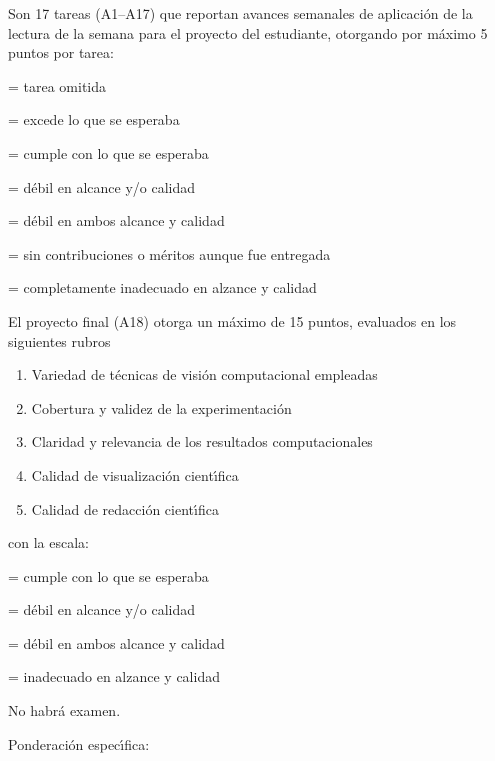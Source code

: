 \documentclass[10 pt]{article}
\begin{document}
  Son 17 tareas (A1--A17) que reportan avances semanales de aplicaci\'{o}n
  de la lectura de la semana para el proyecto del estudiante,
  otorgando por m\'{a}ximo 5 puntos por tarea:
  \begin{description}[itemsep=0em]
  \item[NP]{= tarea omitida}
  \item[5]{= excede lo que se esperaba}
  \item[4]{= cumple con lo que se esperaba}
  \item[3]{= d\'{e}bil en alcance y/o calidad}
  \item[2]{= d\'{e}bil en ambos alcance y calidad}
  \item[1]{= sin contribuciones o m\'{e}ritos aunque fue entregada}
  \item[0]{= completamente inadecuado en alzance y calidad}
  \end{description}
  El proyecto final (A18) otorga un m\'{a}ximo de 15 puntos, evaluados en los
  siguientes rubros
  \begin{enumerate}[itemsep=0em]
  \item{Variedad de t\'{e}cnicas de visi\'{o}n computacional empleadas}
  \item{Cobertura y validez de la experimentaci\'{o}n}
  \item{Claridad y relevancia de los resultados computacionales}    
  \item{Calidad de visualizaci\'{o}n cient\'{\i}fica}
  \item{Calidad de redacci\'{o}n cient\'{\i}fica}
  \end{enumerate}
  con la escala:
  \begin{description}[itemsep=0em]
  \item[3]{= cumple con lo que se esperaba}
  \item[2]{= d\'{e}bil en alcance y/o calidad}
  \item[1]{= d\'{e}bil en ambos alcance y calidad}
  \item[0]{= inadecuado en alzance y calidad}
  \end{description}


  No habr\'{a} examen.


  
  Ponderaci\'{o}n espec\'{\i}fica:
\end{document}
